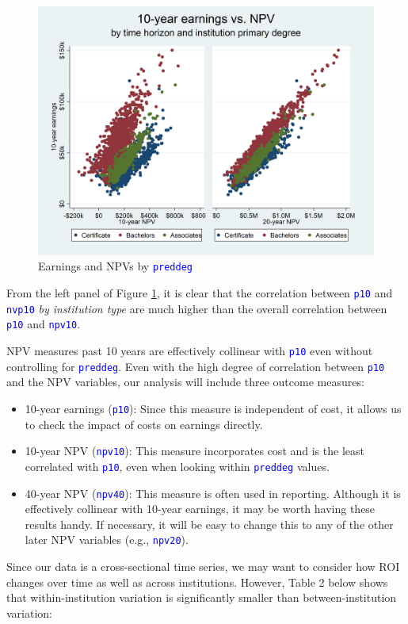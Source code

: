 \documentclass[12pt]{article}
\numberwithin{equation}{section}
\newcommand{\Varnm}[1]{\texttt{\textcolor{Blue}{#1}}}
\begin{document}
\begin{figure}[h!]
\caption{Earnings and NPVs by \Varnm{preddeg}}
\label{fig:p10_npv_correlations_by_preddeg_mr}
\includegraphics[width=7.08in]{p10_npv_correlations_by_preddeg_mr.png}
\centering
\end{figure}
From the left panel of Figure \ref{fig:p10_npv_correlations_by_preddeg_mr}, it is clear that the correlation between \Varnm{p10} and \Varnm{nvp10} \textit{by institution type} are much higher than the overall correlation between \Varnm{p10} and \Varnm{npv10}.

NPV measures past 10 years are effectively collinear with \Varnm{p10} even without controlling for \Varnm{preddeg}.
\newpage
Even with the high degree of correlation between \Varnm{p10} and the NPV variables, our analysis will include three outcome measures:
\begin{itemize}
\item 10-year earnings (\Varnm{p10}): Since this measure is independent of cost, it allows us to check the impact of costs on earnings directly.
\item 10-year NPV (\Varnm{npv10}): This measure incorporates cost and is the least correlated with \Varnm{p10}, even when looking within \Varnm{preddeg} values.
\item 40-year NPV (\Varnm{npv40}): This measure is often used in reporting. Although it is effectively collinear with 10-year earnings, it may be worth having these results handy. If necessary, it will be easy to change this to any of the other later NPV variables (e.g., \Varnm{npv20}).
\end{itemize}
Since our data is a cross-sectional time series, we may want to consider how ROI changes over time as well as across institutions. However, Table 2 below shows that within-institution variation is significantly smaller than between-institution variation: 

\end{document}
